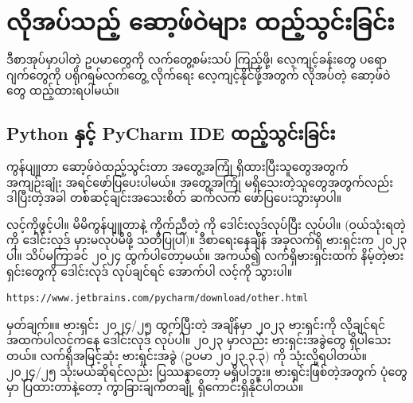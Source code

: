 \chapter{လိုအပ်သည့် ဆော့ဖ်ဝဲများ ထည့်သွင်းခြင်း} \label{apdx1}

ဒီစာအုပ်မှာပါတဲ့ ဥပမာတွေကို လက်တွေ့စမ်းသပ်  ကြည့်ဖို့၊ လေ့ကျင့်ခန်းတွေ ပရောဂျက်တွေကို ပရိုဂရမ်လက်တွေ့ လိုက်ရေး လေ့ကျင့်နိုင်ဖို့အတွက် လိုအပ်တဲ့ ဆော့ဖ်ဝဲတွေ ထည့်ထားရပါမယ်။

\section*{Python နှင့် PyCharm IDE ထည့်သွင်းခြင်း}
ကွန်ပျူတာ ဆော့ဖ်ဝဲထည့်သွင်းတာ  အတွေ့အကြုံ ရှိထားပြီးသူတွေအတွက် အကျဉ်းချုံး အရင်ဖော်ပြပေးပါမယ်။ အတွေ့အကြုံ မရှိသေးတဲ့သူတွေအတွက်လည်း ဒါပြီးတဲ့အခါ တစ်ဆင့်ချင်းအသေးစိတ် ဆက်လက် ဖော်ပြပေးသွားမှာပါ။

 လင့်ကိုဖွင့်ပါ။ မိမိကွန်ပျူတာနဲ့ ကိုက်ညီတဲ့  ကို ဒေါင်းလုဒ်လုပ်ပြီး  လုပ်ပါ။ (ဝယ်သုံးရတဲ့  ကို ဒေါင်းလုဒ် မှားမလုပ်မိဖို့ သတိပြုပါ)။ ဒီစာရေးနေချိန် အခုလက်ရှိ ဗားရှင်းက ၂၀၂၃ ပါ။ သိပ်မကြာခင် ၂၀၂၄ ထွက်ပါတော့မယ်။ အကယ်၍ လက်ရှိဗားရှင်းထက် နိမ့်တဲ့ဗားရှင်းတွေကို ဒေါင်းလုဒ် လုပ်ချင်ရင် အောက်ပါ လင့်ကို သွားပါ။
%
\begin{verbatim}
https://www.jetbrains.com/pycharm/download/other.html
\end{verbatim}
%
\begin{mytcbox}
\noindent \qquad မှတ်ချက်။\qquad ။ ဗားရှင်း ၂၀၂၄/၂၅ ထွက်ပြီးတဲ့ အချိန်မှာ ၂၀၂၃ ဗားရှင်းကို လိုချင်ရင် အထက်ပါလင့်ကနေ ဒေါင်းလုဒ် လုပ်ပါ။ ၂၀၂၃ မှာလည်း ဗားရှင်းအခွဲတွေ ရှိပါသေးတယ်။ လက်ရှိအမြင့်ဆုံး ဗားရှင်းအခွဲ (ဥပမာ ၂၀၂၃.၃.၃) ကို သုံးလို့ရပါတယ်။ ၂၀၂၄/၂၅ သုံးမယ်ဆိုရင်လည်း ပြဿနာတော့ မရှိပါဘူး။  ဗားရှင်းဖြစ်တဲ့အတွက် ပုံတွေမှာ ပြထားတာနဲ့တော့ ကွာခြားချက်တချို့ ရှိကောင်းရှိနိုင်ပါတယ်။
\end{mytcbox}
%

